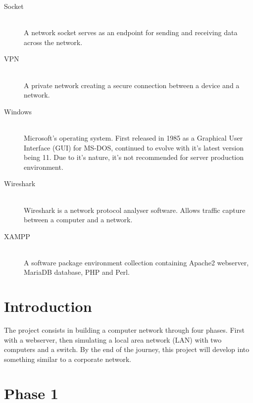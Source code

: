 \documentclass[11pt,a4paper]{report}
\begin{document}
\begin{description}
        \item[Socket] \hfill \\
            A network socket serves as an endpoint for sending and receiving data across the network.
        \item[VPN] \hfill \\
            A private network creating a secure connection between a device and a network.
        \item[Windows] \hfill \\
            Microsoft's operating system. First released in 1985 as a Graphical User Interface (GUI) for MS-DOS, continued to evolve with it's latest version being 11.
            Due to it's nature, it's not recommended for server production environment.
        \item[Wireshark] \hfill \\
            Wireshark is a network protocol analyser software. Allows traffic capture between a computer and a network.
        \item[XAMPP] \hfill \\
            A software package environment collection containing Apache2 webserver, MariaDB database, PHP and Perl.
    \end{description}

\chapter{Introduction}
    \pagestyle{fancy}
    The project consists in building a computer network through four phases. First with a webserver, then simulating a local area network (LAN) with two computers and a switch.
    By the end of the journey, this project will develop into something similar to a corporate network.

    \setcounter{page}{1}

\chapter{Phase 1}
\end{document}

